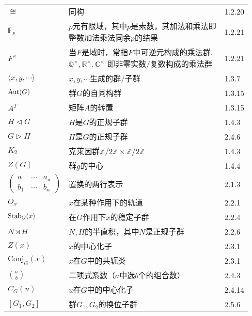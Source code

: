 \begin{longtable}{lp{.6\linewidth}l}
	$\cong$ & 同构 & 1.2.20\\
	$\mathbb{F}_p$ & $p$元有限域，其中$p$是素数，其加法和乘法即整数加法乘法同余$p$的结果 & 1.2.21\\
	$F^{\times}$ & 当$F$是域时，常指$F$中可逆元构成的乘法群. $\mathbb{Q}^{\times}, \mathbb{R}^{\times}, \mathbb{C}^{\times}$ 即非零实数/复数构成的乘法群 & 1.2.21\\
	$\langle x,y,\cdots \rangle$ & $x,y,\cdots$生成的群/子群 & 1.3.7\\
	$\operatorname{Aut}(G)$ & 群$G$的自同构群 & 1.3.15\\
	$A^T$ & 矩阵$A$的转置 & 1.3.15\\
	$H\vartriangleleft G$ & $H$是$G$的正规子群 & 1.4.3\\
	$G\vartriangleright H$ & $H$是$G$的正规子群 & 2.4.6\\
	$K_2$ & 克莱因群$\mathbb{Z}/2\mathbb{Z}\times\mathbb{Z}/2\mathbb{Z}$ & 1.4.3\\
	$Z(G)$ & 群$g$的中心 & 1.4.4\\
	$\begin{pmatrix}
		a_1 & \cdots & a_n\\
		b_1 & \cdots & b_n
	\end{pmatrix}$ & 置换的两行表示 & 2.1.3\\
	$O_x$ & $x$在某种作用下的轨道 & 2.2.1\\
	$\operatorname{Stab}_G(x)$ & 在$G$作用下$x$的稳定子群 & 2.2.4\\
	$N\rtimes H$ & $N,H$的半直积，其中$N$是正规子群 & 2.2.6\\
	$Z(x)$ & $x$的中心化子& 2.3.1\\
	$\mathrm{Conj}_G(x)$ & $x$在$G$中的共轭类 & 2.3.1\\
	$\binom{a}{b}$ & 二项式系数（$a$中选$b$个的组合数） & 2.4.3\\
	$C_G(u)$ & $u$在$G$中的中心化子 & 2.4.14\\
	$[G_1, G_2]$ & 群$G_1, G_2$的换位子群 & 2.5.6
	
\end{longtable}
